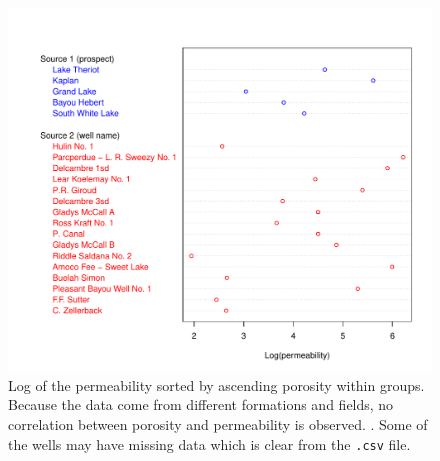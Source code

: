 \documentclass[review,authoryear, 12pt]{elsarticle}\usepackage[]{graphicx}\usepackage[]{color}
\makeatletter
\def\maxwidth{ %
  \ifdim\Gin@nat@width>\linewidth
    \linewidth
  \else
    \Gin@nat@width
  \fi
}
\newenvironment{knitrout}{}{} %
\makeatother
\begin{document}
\begin{knitrout}
\color{fgcolor}\begin{figure}[]

\includegraphics[width=\maxwidth]{figure/PermDotChart} \caption[Log of the permeability sorted by ascending porosity within groups]{Log of the permeability sorted by ascending porosity within groups. Because the data come from different formations and fields, no correlation between porosity and permeability is observed.  . Some of the wells may have missing data which is clear from the \texttt{.csv} file.\label{Fig:PermDotChart}}
\end{figure}


\end{knitrout}
\end{document}
